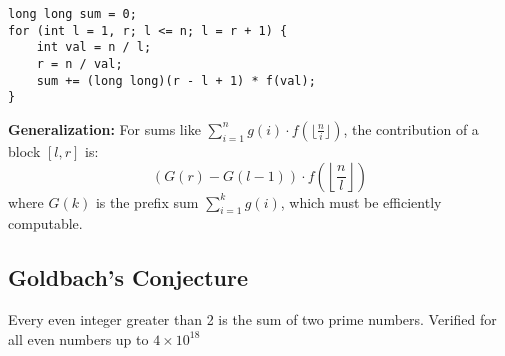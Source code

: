 \begin{verbatim}
long long sum = 0;
for (int l = 1, r; l <= n; l = r + 1) {
    int val = n / l;
    r = n / val;
    sum += (long long)(r - l + 1) * f(val);
}
\end{verbatim}

\textbf{Generalization:} For sums like $\sum_{i=1}^{n} g(i) \cdot f(\lfloor \frac{n}{i} \rfloor)$, the contribution of a block $[l, r]$ is:
$$ (G(r) - G(l-1)) \cdot f\left(\left\lfloor \frac{n}{l} \right\rfloor\right) $$
where $G(k)$ is the prefix sum $\sum_{i=1}^k g(i)$, which must be efficiently computable.

\subsection{Goldbach's Conjecture}
Every even integer greater than 2 is the sum of two prime numbers. Verified for all even numbers up to $4 \times 10^{18}$
